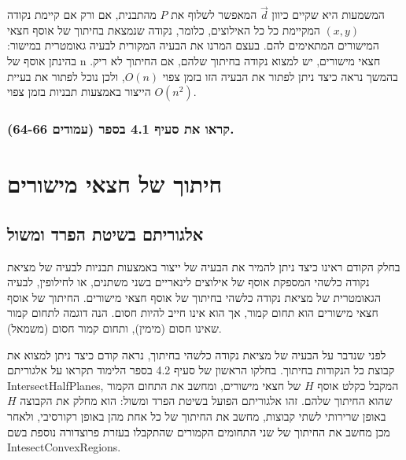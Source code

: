 \documentclass[
]{book}
\begin{document}
המשמעות היא שקיים כיוון \(\overrightarrow{d}\) המאפשר לשלוף את \(P\) מהתבנית, אם ורק אם קיימת נקודה \(( x, y )\) המקיימת כל כל האילוצים, כלומר, נקודה שנמצאת בחיתוך של אוסף חצאי המישורים המתאימים להם. בעצם המרנו את הבעיה המקורית לבעיה גאומטרית במישור: בהינתן אוסף של n חצאי מישורים, יש למצוא נקודה בחיתוך שלהם, אם החיתוך לא ריק. בהמשך נראה כיצד ניתן לפתור את הבעיה הזו בזמן צפוי \(O ( n )\), ולכן נוכל לפתור את בעיית הייצור באמצעות תבניות בזמן צפוי \(O ( n^2 )\).

\hypertarget{ux5e7ux5e8ux5d0ux5d5-ux5d0ux5ea-ux5e1ux5e2ux5d9ux5e3-4.1-ux5d1ux5e1ux5e4ux5e8-ux5e2ux5deux5d5ux5d3ux5d9ux5dd-64-66.}{%
\subsubsection*{קראו את סעיף 4.1 בספר (עמודים 64-66).}\label{ux5e7ux5e8ux5d0ux5d5-ux5d0ux5ea-ux5e1ux5e2ux5d9ux5e3-4.1-ux5d1ux5e1ux5e4ux5e8-ux5e2ux5deux5d5ux5d3ux5d9ux5dd-64-66.}}

\hypertarget{ux5d7ux5d9ux5eaux5d5ux5da-ux5e9ux5dc-ux5d7ux5e6ux5d0ux5d9-ux5deux5d9ux5e9ux5d5ux5e8ux5d9ux5dd}{%
\section{חיתוך של חצאי מישורים}\label{ux5d7ux5d9ux5eaux5d5ux5da-ux5e9ux5dc-ux5d7ux5e6ux5d0ux5d9-ux5deux5d9ux5e9ux5d5ux5e8ux5d9ux5dd}}

\hypertarget{ux5d0ux5dcux5d2ux5d5ux5e8ux5d9ux5eaux5dd-ux5d1ux5e9ux5d9ux5d8ux5ea-ux5d4ux5e4ux5e8ux5d3-ux5d5ux5deux5e9ux5d5ux5dc}{%
\subsection{אלגוריתם בשיטת הפרד ומשול}\label{ux5d0ux5dcux5d2ux5d5ux5e8ux5d9ux5eaux5dd-ux5d1ux5e9ux5d9ux5d8ux5ea-ux5d4ux5e4ux5e8ux5d3-ux5d5ux5deux5e9ux5d5ux5dc}}

בחלק הקודם ראינו כיצד ניתן להמיר את הבעיה של ייצור באמצעות תבניות לבעיה של מציאת נקודה כלשהי המספקת אוסף של אילוצים לינאריים בשני משתנים, או לחילופין, לבעיה הגאומטרית של מציאת נקודה כלשהי בחיתוך של אוסף חצאי מישורים. החיתוך של אוסף חצאי מישורים הוא תחום קמור, אך הוא אינו חייב להיות חסום. הנה דוגמה לתחום קמור שאינו חסום (מימין), ותחום קמור חסום (משמאל).

לפני שנדבר על הבעיה של מציאת נקודה כלשהי בחיתוך, נראה קודם כיצד ניתן למצוא את קבוצת כל הנקודות בחיתוך. בחלקו הראשון של סעיף 4.2 בספר הלימוד תקראו על אלגוריתם IntersectHalfPlanes, המקבל כקלט אוסף \(H\) של חצאי מישורים, ומחשב את התחום הקמור שהוא החיתוך שלהם. זהו אלגוריתם הפועל בשיטת הפרד ומשול: הוא מחלק את הקבוצה \(H\) באופן שרירותי לשתי קבוצות, מחשב את החיתוך של כל אחת מהן באופן רקורסיבי, ולאחר מכן מחשב את החיתוך של שני התחומים הקמורים שהתקבלו בעזרת פרוצדורה נוספת בשם IntesectConvexRegions.
\end{document}
